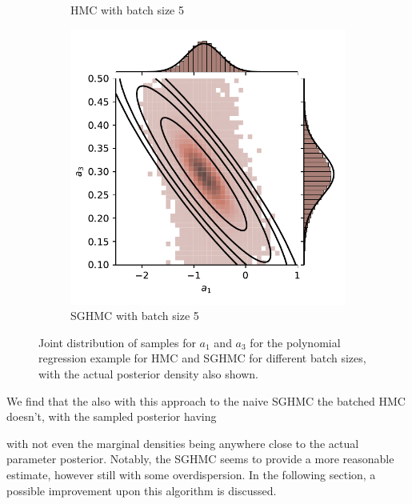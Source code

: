 \begin{figure}[htbp]
\begin{subfigure}[b]{0.45\linewidth}
        \caption{HMC with batch size 5}
    \end{subfigure}
    \begin{subfigure}[b]{0.45\linewidth}
        \centering
        \includegraphics[width=\linewidth]{Figures/simulated_joint_SGHMC_5.pdf} 
        \caption{SGHMC with batch size 5}
    \end{subfigure}
    \caption{Joint distribution of samples for $a_1$ and $a_3$ for the polynomial regression example for HMC and SGHMC for different batch sizes, with the actual posterior density also shown.}
    \label{fig:simulated_joint_comp}
\end{figure}
We find that the also with this approach to the naive SGHMC the batched HMC doesn't, with the sampled posterior having 

with not even the marginal densities being anywhere close to the actual parameter posterior.
Notably, the SGHMC seems to provide a more reasonable estimate, however still with some overdispersion.
In the following section, a possible improvement upon this algorithm is discussed.

